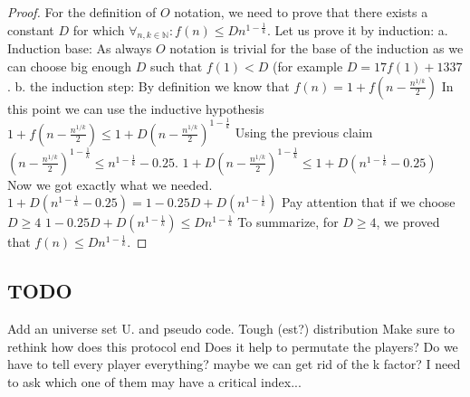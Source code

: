 \documentclass{article}
\theoremstyle{plain}
\begin{document}
\begin{proof}
For the definition of $O$ notation, we need to prove that there exists a constant $D$ for which $\forall_{n, k \in \mathbb{N}} : f(n) \leq Dn^{1-\frac{1}{k}}$. \newline
Let us prove it by induction: \newline
a. Induction base: \newline
As always $O$ notation is trivial for the base of the induction as we can choose big enough $D$ such that $f(1) < D$ (for example $D=17f(1)+1337$. \newline
b. the induction step: \newline
By definition we know that \newline
$f(n) = 1 + f(n - \frac{n^{1/k}}{2})$ \newline
In this point we can use the inductive hypothesis \newline
$1 + f(n - \frac{n^{1/k}}{2}) \leq 1 + D(n - \frac{n^{1/k}}{2})^{1-\frac{1}{k}}$ \newline
Using the previous claim $(n - \frac{n^{1/k}}{2})^{1-\frac{1}{k}} \leq n^{1-\frac{1}{k}}-0.25$. \newline
$1 + D(n - \frac{n^{1/k}}{2})^{1-\frac{1}{k}} \leq 1 + D(n^{1-\frac{1}{k}}-0.25)$ \newline
Now we got exactly what we needed. \newline
$1 + D(n^{1-\frac{1}{k}}-0.25) = 1 - 0.25D + D(n^{1-\frac{1}{k}}) $ \newline
Pay attention that if we choose $D \geq 4$ \newline
$1 - 0.25D + D(n^{1-\frac{1}{k}}) \leq Dn^{1-\frac{1}{k}}$ \newline
To summarize, for $D \geq 4$, we proved that \newline
$f(n) \leq Dn^{1-\frac{1}{k}}$. \newline
\end{proof}

\subsection{TODO}
Add an universe set U. and pseudo code. 
Tough (est?) distribution\newline
Make sure to rethink how does this protocol end \newline
Does it help to permutate the players? \newline
Do we have to tell every player everything? maybe we can get rid of the k factor? I need to ask which one of them may have a critical index... \newline
\end{document}
